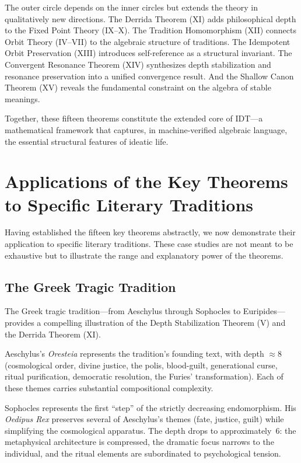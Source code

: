 \documentclass[11pt,openany]{book}
\theoremstyle{definition}
\theoremstyle{plain}
\theoremstyle{remark}
\begin{document}
The outer circle depends on the inner circles but extends the theory in qualitatively new directions. The Derrida Theorem (XI) adds philosophical depth to the Fixed Point Theory (IX--X). The Tradition Homomorphism (XII) connects Orbit Theory (IV--VII) to the algebraic structure of traditions. The Idempotent Orbit Preservation (XIII) introduces self-reference as a structural invariant. The Convergent Resonance Theorem (XIV) synthesizes depth stabilization and resonance preservation into a unified convergence result. And the Shallow Canon Theorem (XV) reveals the fundamental constraint on the algebra of stable meanings.

Together, these fifteen theorems constitute the extended core of IDT---a mathematical framework that captures, in machine-verified algebraic language, the essential structural features of ideatic life.

\section{Applications of the Key Theorems to Specific Literary Traditions}

Having established the fifteen key theorems abstractly, we now demonstrate their application to specific literary traditions. These case studies are not meant to be exhaustive but to illustrate the range and explanatory power of the theorems.

\subsection{The Greek Tragic Tradition}

The Greek tragic tradition---from Aeschylus through Sophocles to Euripides---provides a compelling illustration of the Depth Stabilization Theorem (V) and the Derrida Theorem (XI).

Aeschylus's \emph{Oresteia} represents the tradition's founding text, with depth $\approx 8$ (cosmological order, divine justice, the polis, blood-guilt, generational curse, ritual purification, democratic resolution, the Furies' transformation). Each of these themes carries substantial compositional complexity.

Sophocles represents the first ``step'' of the strictly decreasing endomorphism. His \emph{Oedipus Rex} preserves several of Aeschylus's themes (fate, justice, guilt) while simplifying the cosmological apparatus. The depth drops to approximately~$6$: the metaphysical architecture is compressed, the dramatic focus narrows to the individual, and the ritual elements are subordinated to psychological tension.
\end{document}
